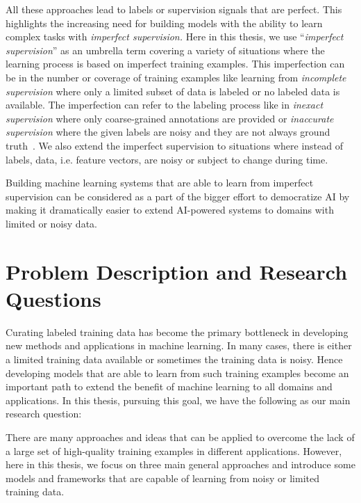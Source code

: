 All these approaches lead to labels or supervision signals that are perfect. This highlights the increasing need for building models with the ability to learn complex tasks with \emph{imperfect supervision.} 
%
Here in this thesis, we use ``\emph{imperfect supervision}'' as an umbrella term covering a variety of situations where the learning process is based on imperfect training examples. This imperfection can be in the number or coverage of training examples like learning from \emph{incomplete supervision} where only a limited subset of data is labeled or no labeled data is available. The imperfection can refer to the labeling process like in \emph{inexact supervision} where only coarse-grained annotations are provided or \emph{inaccurate supervision} where the given labels are noisy and they are not always ground truth~\citep{zhou2018brief}. We also extend the imperfect supervision to situations where instead of labels, data, i.e. feature vectors, are noisy or subject to change during time.

Building machine learning systems that are able to learn from imperfect supervision can be considered as a part of the bigger effort to democratize AI by making it dramatically easier to extend AI-powered systems to domains with limited or noisy data.


\section{Problem Description and Research Questions}
Curating labeled training data has become the primary bottleneck in developing new methods and applications in machine learning. In many cases, there is either a limited training data available or sometimes the training data is noisy. Hence developing models that are able to learn from such training examples become an important path to extend the benefit of machine learning to all domains and applications. In this thesis, pursuing this goal, we have the following as our main research question:

There are many approaches and ideas that can be applied to overcome the lack of a large set of high-quality training examples in different applications. However, here in this thesis, we focus on three main general approaches and introduce some models and frameworks that are capable of learning from noisy or limited training data. 

